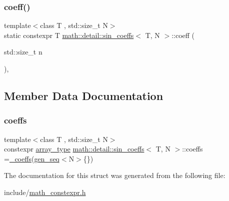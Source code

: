 \mbox{\label{structmath_1_1detail_1_1sin__coeffs_ad40f7e723b43aa410e3c260604ae4cac}} 
\subsubsection{\texorpdfstring{coeff()}{coeff()}}
{\footnotesize\ttfamily template$<$class T , std\+::size\+\_\+t N$>$ \\
static constexpr T \hyperlink{structmath_1_1detail_1_1sin__coeffs}{math\+::detail\+::sin\+\_\+coeffs}$<$ T, N $>$\+::coeff (\begin{DoxyParamCaption}\item[{std\+::size\+\_\+t}]{n }\end{DoxyParamCaption})\hspace{0.3cm}{\ttfamily [inline]}, {\ttfamily [static]}}



\subsection{Member Data Documentation}
\mbox{\label{structmath_1_1detail_1_1sin__coeffs_a78da0b0c2db5a2c060633a296a21dcc8}} 
\subsubsection{\texorpdfstring{coeffs}{coeffs}}
{\footnotesize\ttfamily template$<$class T , std\+::size\+\_\+t N$>$ \\
constexpr \hyperlink{structmath_1_1detail_1_1sin__coeffs_a6d08252591f05c40e48bf7931b2eb135}{array\+\_\+type} \hyperlink{structmath_1_1detail_1_1sin__coeffs}{math\+::detail\+::sin\+\_\+coeffs}$<$ T, N $>$\+::coeffs =\hyperlink{structmath_1_1detail_1_1sin__coeffs_a1c5e8b54d12b2320c994c4eaf7b69b61}{\+\_\+coeffs}(\hyperlink{structmath_1_1detail_1_1gen__seq}{gen\+\_\+seq}$<$N$>$\{\})\hspace{0.3cm}{\ttfamily [static]}}



The documentation for this struct was generated from the following file\+:\begin{DoxyCompactItemize}
\item 
include/\hyperlink{math__constexpr_8h}{math\+\_\+constexpr.\+h}\end{DoxyCompactItemize}
